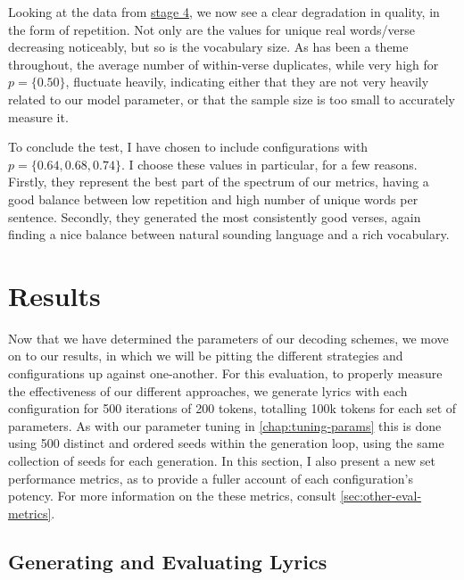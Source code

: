 Looking at the data from \hyperref[fig:top-p-param-eval-s4]{stage 4}, we now see a clear degradation in quality, in the form of repetition. Not only are the values for unique real words/verse decreasing noticeably, but so is the vocabulary size. As has been a theme throughout, the average number of within-verse duplicates, while very high for $p=\{0.50\}$, fluctuate heavily, indicating either that they are not very heavily related to our model parameter, or that the sample size is too small to accurately measure it.

To conclude the test, I have chosen to include configurations with $p=\{0.64,0.68,0.74\}$. I choose these values in particular, for a few reasons. Firstly, they represent the best part of the spectrum of our metrics, having a good balance between low repetition and high number of unique words per sentence. Secondly, they generated the most consistently good verses, again finding a nice balance between natural sounding language and a rich vocabulary.

\section{Results}
\label{chap:results}

Now that we have determined the parameters of our decoding schemes, we move on to our results, in which we will be pitting the different strategies and configurations up against one-another. For this evaluation, to properly measure the effectiveness of our different approaches, we generate lyrics with each configuration for 500 iterations of 200 tokens, totalling 100k tokens for each set of parameters. As with our parameter tuning in  \cref{chap:tuning-params} this is done using 500 distinct and ordered seeds within the generation loop, using the same collection of seeds for each generation. In this section, I also present a new set performance metrics, as to provide a fuller account of each configuration's potency. For more information on the these metrics, consult \cref{sec:other-eval-metrics}.

\subsection{Generating and Evaluating Lyrics}
\label{sec:gen+eval}

